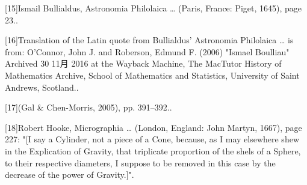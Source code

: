 [15]Ismail Bullialdus, Astronomia Philolaica … (Paris, France: Piget, 1645), page 23..

[16]Translation of the Latin quote from Bullialdus' Astronomia Philolaica … is from: O'Connor, John J. and Roberson, Edmund F. (2006) "Ismael Boulliau" Archived 30 11月 2016 at the Wayback Machine, The MacTutor History of Mathematics Archive, School of Mathematics and Statistics, University of Saint Andrews, Scotland..

[17](Gal & Chen-Morris, 2005), pp. 391–392..

[18]Robert Hooke, Micrographia … (London, England: John Martyn, 1667), page 227: "[I say a Cylinder, not a piece of a Cone, because, as I may elsewhere shew in the Explication of Gravity, that triplicate proportion of the shels of a Sphere, to their respective diameters, I suppose to be removed in this case by the decrease of the power of Gravity.]".
